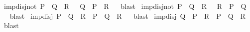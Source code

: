 \begin{isabellebody}
\begin{isamarkuptext}
\end{isamarkuptext}\isamarkuptrue%
\isamarkupfalse%
\ imp{\isacharunderscore}{\kern0pt}disj{\isacharunderscore}{\kern0pt}not{}{\isacharcolon}{\kern0pt}\ {\isachardoublequoteopen}{\isacharparenleft}{\kern0pt}P\ {\isasymlongrightarrow}\ Q\ {\isasymor}\ R{\isacharparenright}{\kern0pt}\ {\isasymlongleftrightarrow}\ {\isacharparenleft}{\kern0pt}{\isasymnot}\ Q\ {\isasymlongrightarrow}\ P\ {\isasymlongrightarrow}\ R{\isacharparenright}{\kern0pt}{\isachardoublequoteclose}%
\isadelimproof
\ %
\endisadelimproof
%
\isatagproof
{}\isamarkupfalse%
\ blast%
\endisatagproof
{\isafoldproof}%
%
\isadelimproof
%
\endisadelimproof
\isanewline
{}\isamarkupfalse%
\ imp{\isacharunderscore}{\kern0pt}disj{\isacharunderscore}{\kern0pt}not{}{\isacharcolon}{\kern0pt}\ {\isachardoublequoteopen}{\isacharparenleft}{\kern0pt}P\ {\isasymlongrightarrow}\ Q\ {\isasymor}\ R{\isacharparenright}{\kern0pt}\ {\isasymlongleftrightarrow}\ {\isacharparenleft}{\kern0pt}{\isasymnot}\ R\ {\isasymlongrightarrow}\ P\ {\isasymlongrightarrow}\ Q{\isacharparenright}{\kern0pt}{\isachardoublequoteclose}%
\isadelimproof
\ %
\endisadelimproof
%
\isatagproof
{}\isamarkupfalse%
\ blast%
\endisatagproof
{\isafoldproof}%
%
\isadelimproof
%
\endisadelimproof
\isanewline
\isanewline
{}\isamarkupfalse%
\ imp{\isacharunderscore}{\kern0pt}disj{}{\isacharcolon}{\kern0pt}\ {\isachardoublequoteopen}{\isacharparenleft}{\kern0pt}{\isacharparenleft}{\kern0pt}P\ {\isasymlongrightarrow}\ Q{\isacharparenright}{\kern0pt}\ {\isasymor}\ R{\isacharparenright}{\kern0pt}\ {\isasymlongleftrightarrow}\ {\isacharparenleft}{\kern0pt}P\ {\isasymlongrightarrow}\ Q\ {\isasymor}\ R{\isacharparenright}{\kern0pt}{\isachardoublequoteclose}%
\isadelimproof
\ %
\endisadelimproof
%
\isatagproof
{}\isamarkupfalse%
\ blast%
\endisatagproof
{\isafoldproof}%
%
\isadelimproof
%
\endisadelimproof
\isanewline
{}\isamarkupfalse%
\ imp{\isacharunderscore}{\kern0pt}disj{}{\isacharcolon}{\kern0pt}\ {\isachardoublequoteopen}{\isacharparenleft}{\kern0pt}Q\ {\isasymor}\ {\isacharparenleft}{\kern0pt}P\ {\isasymlongrightarrow}\ R{\isacharparenright}{\kern0pt}{\isacharparenright}{\kern0pt}\ {\isasymlongleftrightarrow}\ {\isacharparenleft}{\kern0pt}P\ {\isasymlongrightarrow}\ Q\ {\isasymor}\ R{\isacharparenright}{\kern0pt}{\isachardoublequoteclose}%
\isadelimproof
\ %
\endisadelimproof
%
\isatagproof
{}\isamarkupfalse%
\ blast%
\endisatagproof
{\isafoldproof}%

\end{isabellebody}
